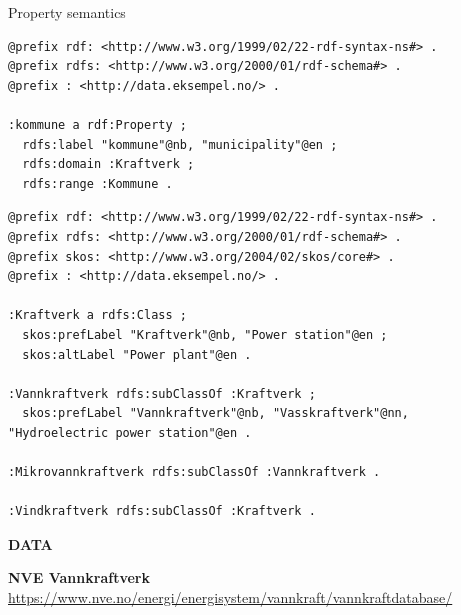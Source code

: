 \documentclass{dt}
\begin{document}
\begin{frame}[fragile]{Property semantics}
\begin{code}
\begin{verbatim}
@prefix rdf: <http://www.w3.org/1999/02/22-rdf-syntax-ns#> .
@prefix rdfs: <http://www.w3.org/2000/01/rdf-schema#> .
@prefix : <http://data.eksempel.no/> .

:kommune a rdf:Property ;
  rdfs:label "kommune"@nb, "municipality"@en ;
  rdfs:domain :Kraftverk ;
  rdfs:range :Kommune .
\end{verbatim}
\end{code}
\end{frame}

\begin{frame}[fragile]{}
\begin{code}
\begin{verbatim}
@prefix rdf: <http://www.w3.org/1999/02/22-rdf-syntax-ns#> .
@prefix rdfs: <http://www.w3.org/2000/01/rdf-schema#> .
@prefix skos: <http://www.w3.org/2004/02/skos/core#> .
@prefix : <http://data.eksempel.no/> .

:Kraftverk a rdfs:Class ;
  skos:prefLabel "Kraftverk"@nb, "Power station"@en ;
  skos:altLabel "Power plant"@en .

:Vannkraftverk rdfs:subClassOf :Kraftverk ;
  skos:prefLabel "Vannkraftverk"@nb, "Vasskraftverk"@nn, "Hydroelectric power station"@en .

:Mikrovannkraftverk rdfs:subClassOf :Vannkraftverk .

:Vindkraftverk rdfs:subClassOf :Kraftverk .
\end{verbatim}
\end{code}
\end{frame}




\begin{frame}
\Huge{\textbf{DATA}}
\end{frame}

\begin{frame}{}
\begin{center}
\end{center}
\vspace{5pt}
\small{\textbf{NVE Vannkraftverk} \url{https://www.nve.no/energi/energisystem/vannkraft/vannkraftdatabase/}}
\end{frame}
\end{document}
